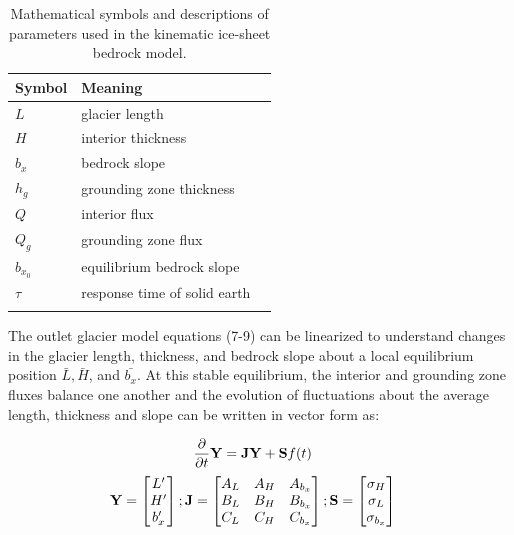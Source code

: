 \documentclass[tc, manuscript]{copernicus}
\begin{document}
\begin{table}[h]
    \begin{tabular}{lll}
        Symbol & Meaning \\
        \hline
        $L$ & glacier length \\
        $H$ & interior thickness \\
        $b_x$ & bedrock slope \\
        $h_g$ & grounding zone thickness \\
        $Q$ & interior flux \\
        $Q_g$ & grounding zone flux \\
        $b_{x_0}$ & equilibrium bedrock slope \\
        $\tau$ & response time of solid earth  \\
        \\
        
    \end{tabular}
    
    \caption{Mathematical symbols and descriptions of parameters used in the kinematic ice-sheet bedrock model.}
\end{table}

The outlet glacier model equations (7-9)  can be linearized to understand changes in the glacier length, thickness, and bedrock slope about a local equilibrium position $\bar{L}, \bar{H}$, and $\bar{b_x}$. At this stable equilibrium, the interior and grounding zone fluxes balance one another and the evolution of fluctuations about the average length, thickness and slope can be written in vector form as:

\begin{align}
\frac{\partial}{\partial t}
\bold{Y}
 &=
\bold{J}
  \bold{Y}
    +
    \bold{S} f(t)&
\end{align}
\begin{align}
\bf{Y} = 
 \begin{bmatrix} L' \\ H' \\ b_x' \end{bmatrix};
 \bf{J}=
  \begin{bmatrix}
   A_L & A_H & A_{b_x}  \\
   B_L & B_H& B_{b_x} \\
   C_L & C_H & C_{b_x}
   \end{bmatrix};
  \bf{S}=
    \begin{bmatrix} \sigma_H \\  \sigma_L \\ \sigma_{b_x} \end{bmatrix}&
\end{align}
\end{document}
